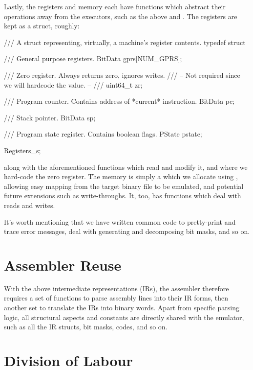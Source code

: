 \documentclass{ictex}
\begin{document}
Lastly, the registers and memory each have functions which abstract their operations away from the executors, such as the above  and . The registers are kept as a struct, roughly:

\begin{code}
/// A struct representing, virtually, a machine's register contents.
typedef struct {
    /// General purpose registers.
    BitData gprs[NUM_GPRS];

    /// Zero register. Always returns zero, ignores writes.
    /// -- Not required since we will hardcode the value. --
    /// uint64_t zr;

    /// Program counter. Contains address of *current* instruction.
    BitData pc;

    /// Stack pointer.
    BitData sp;

    /// Program state register. Contains boolean flags.
    PState pstate;
} Registers_s;
\end{code}

along with the aforementioned functions which read and modify it, and where we hard-code the zero register. The memory is simply a  which we allocate using , allowing easy mapping from the target binary file to be emulated, and potential future extensions such as write-throughs. It, too, has functions which deal with reads and writes.

It's worth mentioning that we have written common code to pretty-print and trace error messages, deal with generating and decomposing bit masks, and so on.

\section{Assembler Reuse} \vspace{-1em}

With the above intermediate representations (IRs), the assembler therefore requires a set of functions to parse assembly lines into their IR forms, then another set to translate the IRs into binary words. Apart from specific parsing logic, all structural aspects and constants are directly shared with the emulator, such as all the IR structs, bit masks, codes, and so on.

\vspace{-1em} \section{Division of Labour} \vspace{-1em}
\end{document}
